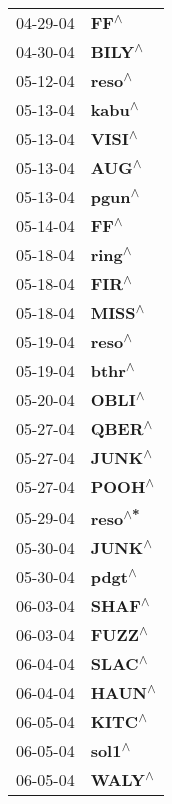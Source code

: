 \begin{supertabular}{p{0.08\textwidth}p{0.2\textwidth}}
 04-29-04 &      \textbf{FF\textsuperscript{$\wedge$}} \\
 04-30-04 &    \textbf{BILY\textsuperscript{$\wedge$}} \\
 05-12-04 &    \textbf{reso\textsuperscript{$\wedge$}} \\
 05-13-04 &    \textbf{kabu\textsuperscript{$\wedge$}} \\
 05-13-04 &    \textbf{VISI\textsuperscript{$\wedge$}} \\
 05-13-04 &     \textbf{AUG\textsuperscript{$\wedge$}} \\
 05-13-04 &    \textbf{pgun\textsuperscript{$\wedge$}} \\
 05-14-04 &      \textbf{FF\textsuperscript{$\wedge$}} \\
 05-18-04 &    \textbf{ring\textsuperscript{$\wedge$}} \\
 05-18-04 &     \textbf{FIR\textsuperscript{$\wedge$}} \\
 05-18-04 &    \textbf{MISS\textsuperscript{$\wedge$}} \\
 05-19-04 &    \textbf{reso\textsuperscript{$\wedge$}} \\
 05-19-04 &    \textbf{bthr\textsuperscript{$\wedge$}} \\
 05-20-04 &    \textbf{OBLI\textsuperscript{$\wedge$}} \\
 05-27-04 &    \textbf{QBER\textsuperscript{$\wedge$}} \\
 05-27-04 &    \textbf{JUNK\textsuperscript{$\wedge$}} \\
 05-27-04 &    \textbf{POOH\textsuperscript{$\wedge$}} \\
 05-29-04 &   \textbf{reso\textsuperscript{$\wedge$*}} \\
 05-30-04 &    \textbf{JUNK\textsuperscript{$\wedge$}} \\
 05-30-04 &    \textbf{pdgt\textsuperscript{$\wedge$}} \\
 06-03-04 &    \textbf{SHAF\textsuperscript{$\wedge$}} \\
 06-03-04 &    \textbf{FUZZ\textsuperscript{$\wedge$}} \\
 06-04-04 &    \textbf{SLAC\textsuperscript{$\wedge$}} \\
 06-04-04 &    \textbf{HAUN\textsuperscript{$\wedge$}} \\
 06-05-04 &    \textbf{KITC\textsuperscript{$\wedge$}} \\
 06-05-04 &    \textbf{sol1\textsuperscript{$\wedge$}} \\
 06-05-04 &    \textbf{WALY\textsuperscript{$\wedge$}} \\

\end{supertabular}
